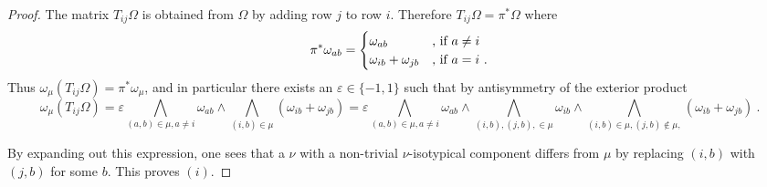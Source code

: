 \documentclass[10pt]{amsart}
\theoremstyle{plain}
\newcommand{\0}{\color{blue}{\mathsf{0}}}
\begin{document}
\begin{proof} The matrix $T_{ij} \Omega$ is obtained from $\Omega$ by adding row $j$ to row $i$. Therefore 
$T_{ij} \Omega = \pi^* \Omega$ where 
\[  \pi^*  \omega_{ab} = \begin{cases}  \omega_{ab} &\hbox{, if } a \neq i \\ 
\omega_{ib}+ \omega_{jb}    &\hbox{, if } a = i \ . \end{cases}\]
Thus $\omega_{\mu}(T_{ij} \Omega) =  \pi^* \omega_{\mu}$, and in particular there exists an  $\varepsilon \in \{-1,1\}$ such that
by antisymmetry of the exterior product
\begin{equation}\label{eq: muTijO}
\omega_{\mu}(T_{ij}\Omega )   = \varepsilon \bigwedge_{(a,b) \in \mu, a\neq i}  \omega_{ab} \wedge \bigwedge_{(i,b) \in \mu} (\omega_{ib} + \omega_{jb})= \varepsilon \bigwedge_{(a,b) \in \mu, a\neq i}  \omega_{ab} \wedge\bigwedge_{(i,b),(j,b), \in \mu}  \omega_{ib} \wedge \bigwedge_{(i,b) \in \mu,(j,b) \notin \mu,} (\omega_{ib} + \omega_{jb}) \ . 
\end{equation}

By expanding out this expression, one sees that a $\nu$ with a non-trivial $\nu$-isotypical component differs from $\mu$
by replacing $(i,b)$ with $(j,b)$ for some $b$. This proves $(i)$.


\end{proof}
\end{document}
